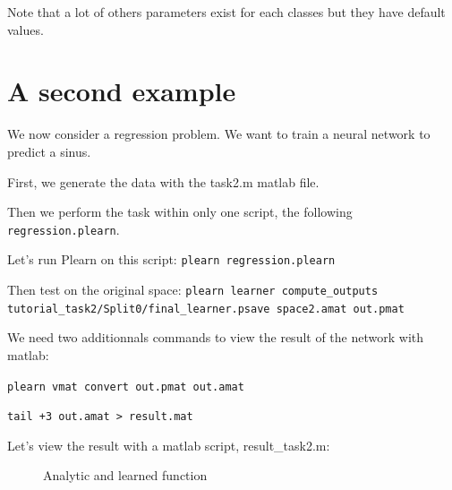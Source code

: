 Note that a lot of others parameters exist for each classes but they have default values.

\section{A second example}

We now consider a regression problem. We want to train a neural network to predict a sinus.

First, we generate the data with the task2.m matlab file.

Then we perform the task within only one script, the following \texttt{regression.plearn}.



Let's run Plearn on this script:
\texttt{plearn regression.plearn}

Then test on the original space:
\texttt{plearn learner compute\_outputs tutorial\_task2/Split0/final\_learner.psave space2.amat out.pmat}

We need two additionnals commands to view the result of the network with matlab:

\texttt{plearn vmat convert out.pmat out.amat}

\texttt{tail +3 out.amat > result.mat}

Let's view the result with a matlab script, result\_task2.m:

\begin{figure}
  \caption{Analytic and learned function}  
\label{reg}
\end{figure}

